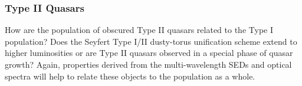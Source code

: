 \subsubsection{Type II Quasars}

How are the population of obscured Type II quasars related to the Type I population? Does the Seyfert Type I/II dusty-torus unification scheme extend to higher luminosities or are Type II quasars observed in a special phase of quasar growth? Again, properties derived from the multi-wavelength SEDs and optical spectra will help to relate these objects to the population as a whole. 




